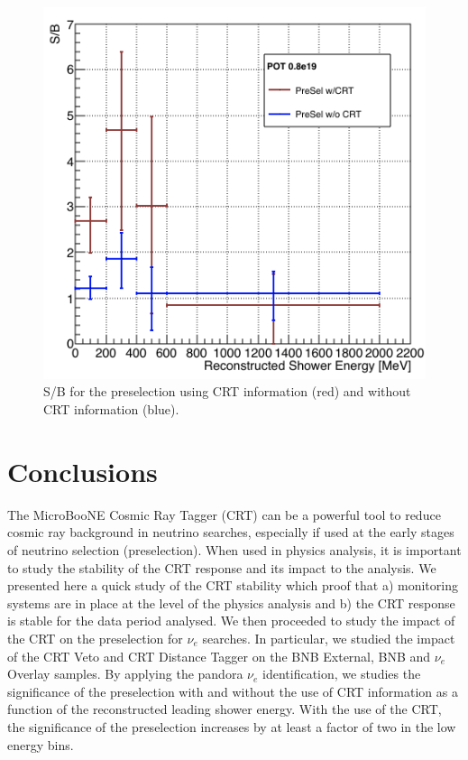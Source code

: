 \begin{figure}[h!]
\centering
\includegraphics[scale=0.4]{images/SoverB}
\caption{S/B for the preselection using CRT information (red) and without CRT information (blue).}
\label{fig:Significance}
\end{figure}

\section{Conclusions}\label{sec:Conclusions}
The MicroBooNE Cosmic Ray Tagger  (CRT) can be a powerful tool to reduce cosmic ray background in neutrino searches, especially if used at the early stages of neutrino selection (preselection). When used in physics analysis, it is important to study the stability of the CRT response and its impact to the analysis. We presented here a quick study of the CRT stability which proof that a) monitoring systems are in place at the level of the physics analysis and b) the CRT response is stable for the data period analysed.
We then proceeded to study the impact of the CRT on the preselection for $\nu_e$ searches. In particular, we studied the impact of the CRT Veto and CRT Distance Tagger on the BNB External, BNB and $\nu_e$ Overlay samples. By applying the pandora $\nu_e$ identification, we studies the significance of the preselection with and without the use of CRT information as a function of the reconstructed leading shower energy. With the use of the CRT, the significance of the preselection increases by at least a factor of two in the low energy bins.




